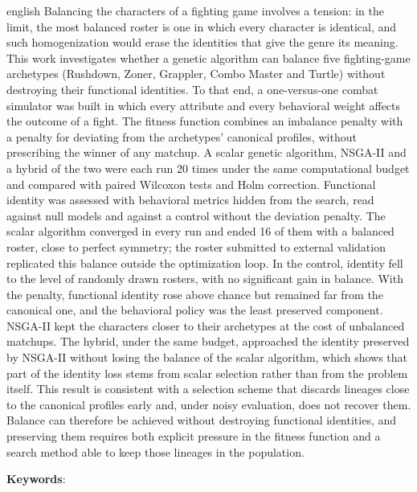 \begin{resumo}[Abstract]
  \vspace{-15pt}

  \begin{otherlanguage*}{english}
  Balancing the characters of a fighting game involves a tension: in the limit, the most balanced roster is one in which every character is identical, and such homogenization would erase the identities that give the genre its meaning. This work investigates whether a genetic algorithm can balance five fighting-game archetypes (Rushdown, Zoner, Grappler, Combo Master and Turtle) without destroying their functional identities. To that end, a one-versus-one combat simulator was built in which every attribute and every behavioral weight affects the outcome of a fight. The fitness function combines an imbalance penalty with a penalty for deviating from the archetypes' canonical profiles, without prescribing the winner of any matchup. A scalar genetic algorithm, NSGA-II and a hybrid of the two were each run 20 times under the same computational budget and compared with paired Wilcoxon tests and Holm correction. Functional identity was assessed with behavioral metrics hidden from the search, read against null models and against a control without the deviation penalty. The scalar algorithm converged in every run and ended 16 of them with a balanced roster, close to perfect symmetry; the roster submitted to external validation replicated this balance outside the optimization loop. In the control, identity fell to the level of randomly drawn rosters, with no significant gain in balance. With the penalty, functional identity rose above chance but remained far from the canonical one, and the behavioral policy was the least preserved component. NSGA-II kept the characters closer to their archetypes at the cost of unbalanced matchups. The hybrid, under the same budget, approached the identity preserved by NSGA-II without losing the balance of the scalar algorithm, which shows that part of the identity loss stems from scalar selection rather than from the problem itself. This result is consistent with a selection scheme that discards lineages close to the canonical profiles early and, under noisy evaluation, does not recover them. Balance can therefore be achieved without destroying functional identities, and preserving them requires both explicit pressure in the fitness function and a search method able to keep those lineages in the population.

  \textbf{Keywords}: \inlinekeywords
\end{otherlanguage*}
\end{resumo}
